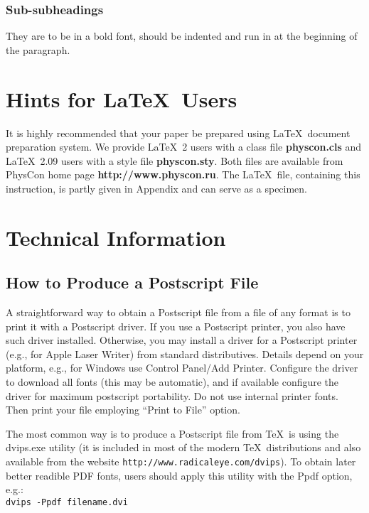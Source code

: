 \documentclass{physcon}
\begin{document}
\subsubsection{Sub-subheadings} They are to be in a bold font,
should be indented and run in at the beginning of the paragraph.

\section{Hints for \LaTeX~Users}

It is highly recommended that your paper be
prepared using \LaTeX~document preparation system.
We provide \LaTeX~2\raisebox{-2pt}{$\varepsilon$}
users with a class file {\bf physcon.cls} and  
\LaTeX~2.09 users with a style file {\bf physcon.sty}.  
Both files are available from PhysCon home page
{\bf http://www.physcon.ru}.
The \LaTeX~file, containing this instruction, is partly
given in Appendix and can serve as a specimen. 

\section{Technical Information}

\subsection{How to Produce a Postscript File}

A straightforward way to obtain a Postscript file from a file
of any format is to print it with a Postscript driver.
If you use a Postscript printer, you also have such driver
installed. Otherwise, you may install a driver for a Postscript
printer (e.g., for Apple Laser Writer) from standard distributives.
Details depend on your platform,
e.g., for Windows use Control Panel/Add Printer.
Configure the driver to download all fonts (this may be automatic), 
and if available configure the driver for maximum postscript portability.
Do not use internal printer fonts. 
Then print your file employing ``Print to File''
option.

The most common way is to produce a Postscript file from \TeX\
is using the dvips.exe utility (it is included in most of the modern
\TeX\ distributions and also available from the website
{\tt http://www.radicaleye.com/dvips}).
To obtain later better readible PDF fonts, users 
should apply this utility with the Ppdf option, e.g.:\\ 
{\tt dvips -Ppdf filename.dvi}
\end{document}
